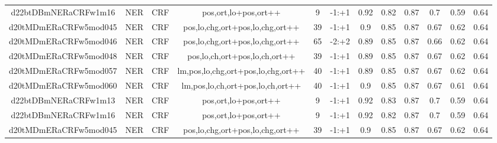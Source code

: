 \documentclass[a4paper]{article}
\begin{document}
\begin{landscape}
\begin{center}
\begin{tabular}{ |c|c|c|c|c|c|c|c|c|c|c|c|}
 	
 
 	
 		
 		\small{ d22btDBmNERaCRFw1m16 } & NER & CRF & pos,ort,lo+pos,ort++  &  9 &  -1:+1  &  0.92 & 0.82 & 0.87  &  0.7 & 0.59 & 0.64 \\
 		

 	
 
 	
 		
 		\small{ d20tMDmERaCRFw5mod045 } & NER & CRF & pos,lo,chg,ort+pos,lo,chg,ort++  &  39 &  -1:+1  &  0.9 & 0.85 & 0.87  &  0.67 & 0.62 & 0.64 \\
 		

 	
 
 	
 		
 		\small{ d20tMDmERaCRFw5mod046 } & NER & CRF & pos,lo,chg,ort+pos,lo,chg,ort++  &  65 &  -2:+2  &  0.89 & 0.85 & 0.87  &  0.66 & 0.62 & 0.64 \\
 		

 	
 
 	
 		
 		\small{ d20tMDmERaCRFw5mod048 } & NER & CRF & pos,lo,ch,ort+pos,lo,ch,ort++  &  39 &  -1:+1  &  0.89 & 0.85 & 0.87  &  0.67 & 0.62 & 0.64 \\
 		

 	
 
 	
 		
 		\small{ d20tMDmERaCRFw5mod057 } & NER & CRF & lm,pos,lo,chg,ort+pos,lo,chg,ort++  &  40 &  -1:+1  &  0.89 & 0.85 & 0.87  &  0.67 & 0.62 & 0.64 \\
 		

 	
 
 	
 		
 		\small{ d20tMDmERaCRFw5mod060 } & NER & CRF & lm,pos,lo,ch,ort+pos,lo,ch,ort++  &  40 &  -1:+1  &  0.9 & 0.85 & 0.87  &  0.67 & 0.61 & 0.64 \\
 		

 	
 
 	
 		
 		\small{ d22btDBmNERaCRFw1m13 } & NER & CRF & pos,ort,lo+pos,ort++  &  9 &  -1:+1  &  0.92 & 0.83 & 0.87  &  0.7 & 0.59 & 0.64 \\
 		

 	
 
 	
 		
 		\small{ d22btDBmNERaCRFw1m16 } & NER & CRF & pos,ort,lo+pos,ort++  &  9 &  -1:+1  &  0.92 & 0.82 & 0.87  &  0.7 & 0.59 & 0.64 \\
 		

 	
 
 	
 		
 		\small{ d20tMDmERaCRFw5mod045 } & NER & CRF & pos,lo,chg,ort+pos,lo,chg,ort++  &  39 &  -1:+1  &  0.9 & 0.85 & 0.87  &  0.67 & 0.62 & 0.64 \\
 		


\end{tabular}
\end{center}
\end{landscape}
\end{document}
